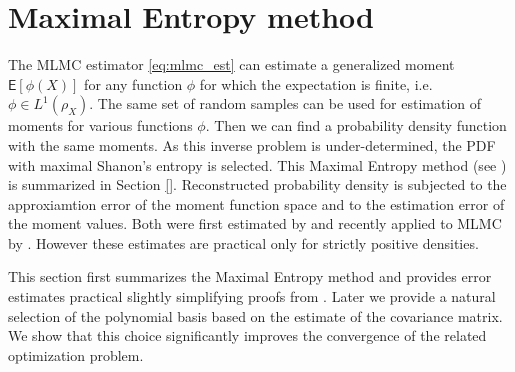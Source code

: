 \documentclass{article}
\def \E{{\mathsf E}}
\begin{document}
% 
% 
% 
% 

\section{Maximal Entropy method}\label{mem}

The MLMC estimator \eqref{eq:mlmc_est} can estimate a generalized moment $\E[\phi(X)]$ 
for any function $\phi$ for which the expectation is finite, i.e. 
$\phi \in L^1(\rho_X)$.
The same set of random samples can be used for estimation of moments for various functions $\phi$. Then we can find a probability density function with the same moments.
As this inverse problem is under-determined, the PDF with maximal Shanon's entropy is selected. This Maximal Entropy method (see \cite{}) is summarized in Section 
\ref{}. Reconstructed probability density is subjected to the approxiamtion error 
of the moment function space and to the estimation error of the moment values. Both were first estimated by \cite{Barron1991} and recently applied to MLMC by \cite{Chernov}. 
However these estimates are practical only for strictly positive densities. 

This section first summarizes the Maximal Entropy method and provides error estimates  practical slightly simplifying proofs from . Later we provide a natural selection of the polynomial basis based on the estimate of the covariance matrix. We show that this choice significantly improves the convergence of the related optimization problem.
\end{document}
